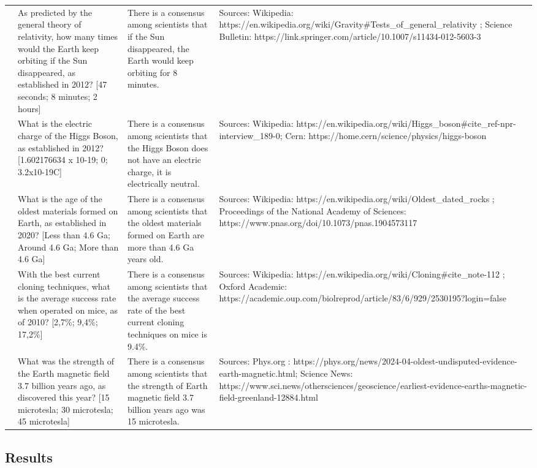 \documentclass[
  doc,floatsintext]{apa6}
\begin{document}
\begin{longtable}[t]{>{\raggedleft\arraybackslash}p{1em}>{\raggedright\arraybackslash}p{12em}>{\raggedright\arraybackslash}p{10em}>{\raggedright\arraybackslash}p{12em}}
\addlinespace
6 & As predicted by the general theory of relativity, how many times would the Earth keep orbiting if the Sun disappeared, as established in 2012? [47 seconds; 8 minutes;  2 hours] & There is a consensus among scientists that if the Sun disappeared, the Earth would keep orbiting for 8 minutes. & Sources: Wikipedia: https://en.wikipedia.org/wiki/Gravity\#Tests\_of\_general\_relativity ; Science Bulletin: https://link.springer.com/article/10.1007/s11434-012-5603-3\\
7 & What is the electric charge of the Higgs Boson, as established in 2012? [1.602176634 x 10-19; 0; 3.2x10-19C] & There is a consensus among scientists that the Higgs Boson does not have an electric charge, it is electrically neutral. & Sources: Wikipedia: https://en.wikipedia.org/wiki/Higgs\_boson\#cite\_ref-npr-interview\_189-0; Cern: https://home.cern/science/physics/higgs-boson\\
8 & What is the age of the oldest materials formed on Earth, as established in 2020? [Less than 4.6 Ga; Around 4.6 Ga; More than 4.6 Ga] & There is a consensus among scientists that the oldest materials formed on Earth are more than 4.6 Ga years old. & Sources: Wikipedia: https://en.wikipedia.org/wiki/Oldest\_dated\_rocks ; Proceedings of the National Academy of Sciences: https://www.pnas.org/doi/10.1073/pnas.1904573117\\
9 & With the best current cloning techniques, what is the average success rate when operated on mice, as of 2010? [2,7\%; 9,4\%; 17,2\%] & There is a consensus among scientists that the average success rate of the best current cloning techniques on mice is 9.4\%. & Sources: Wikipedia: https://en.wikipedia.org/wiki/Cloning\#cite\_note-112 ; Oxford Academic: https://academic.oup.com/biolreprod/article/83/6/929/2530195?login=false\\
10 & What was the strength of the Earth magnetic field 3.7 billion years ago, as discovered this year? [15 microtesla; 30 microtesla; 45 microtesla] & There is a consensus among scientists that the strength of Earth magnetic field 3.7 billion years ago was 15 microtesla. & Sources: Phys.org : https://phys.org/news/2024-04-oldest-undisputed-evidence-earth-magnetic.html; Science News: https://www.sci.news/othersciences/geoscience/earliest-evidence-earths-magnetic-field-greenland-12884.html\\
\bottomrule
\end{longtable}
\endgroup{}

\subsection{Results}\label{results-4}
\end{document}
